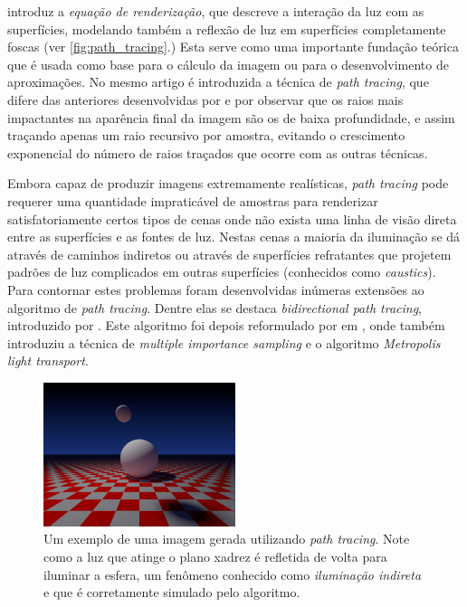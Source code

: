 \documentclass[12pt]{article}
\begin{document}
 introduz a \emph{equação de renderização}, que descreve a interação da luz com as
superfícies, modelando também a reflexão de luz em superfícies completamente foscas (ver
\autoref{fig:path_tracing}.) Esta serve como uma importante fundação teórica que é usada como base
para o cálculo da imagem ou para o desenvolvimento de aproximações. No mesmo artigo é introduzida a
técnica de \emph{path tracing}, que difere das anteriores desenvolvidas por \citeauthor{cook1984} e
\citeauthor{whitted1980} por observar que os raios mais impactantes na aparência final da imagem são
os de baixa profundidade, e assim traçando apenas um raio recursivo por amostra, evitando o
crescimento exponencial do número de raios traçados que ocorre com as outras técnicas.

Embora capaz de produzir imagens extremamente realísticas, \emph{path tracing} pode requerer uma
quantidade impraticável de amostras para renderizar satisfatoriamente certos tipos de cenas onde não
exista uma linha de visão direta entre as superfícies e as fontes de luz. Nestas cenas a maioria da
iluminação se dá através de caminhos indiretos ou através de superfícies refratantes que projetem
padrões de luz complicados em outras superfícies (conhecidos como \emph{caustics}). Para contornar
estes problemas foram desenvolvidas inúmeras extensões ao algoritmo de \emph{path tracing}. Dentre
elas se destaca \emph{bidirectional path tracing}, introduzido por \citet{lafortune1993}. Este
algoritmo foi depois reformulado por \citeauthor{veach1997} em \citep{veach1997}, onde também
introduziu a técnica de \emph{multiple importance sampling} e o algoritmo \emph{Metropolis light
transport}.

\begin{figure}
	\centering
	\includegraphics[width=0.5\textwidth]{exemplo_imagem}
	\caption{
		Um exemplo de uma imagem gerada utilizando \emph{path tracing}. Note como a luz que atinge o
		plano xadrez é refletida de volta para iluminar a esfera, um fenômeno conhecido como
		\emph{iluminação indireta} e que é corretamente simulado pelo algoritmo.
	}
	\label{fig:path_tracing}
\end{figure}
\end{document}
